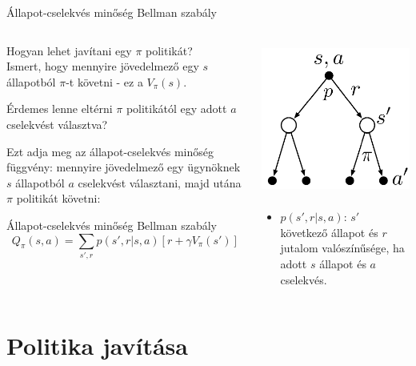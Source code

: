 \documentclass[english, aspectratio=169]{beamer}
\makeatletter
\let\origtableofcontents=\tableofcontents
\def\tableofcontents{\@ifnextchar[{\origtableofcontents}{\gobbletableofcontents}}
\def\gobbletableofcontents#1{\origtableofcontents}
\makeatother
\begin{document}
\begin{frame}{Állapot-cselekvés minőség Bellman szabály}
\begin{columns}
\begin{column}{.6\textwidth}
Hogyan lehet javítani egy $\pi$ politikát?\\
Ismert, hogy mennyire jövedelmező egy $s$ állapotból $\pi$-t követni - ez a $V_\pi(s)$.\par\smallskip 
Érdemes lenne eltérni $\pi$ politikától egy adott $a$ cselekvést választva?\par\smallskip
Ezt adja meg az állapot-cselekvés minőség függvény: mennyire jövedelmező egy ügynöknek $s$ állapotból $a$ cselekvést választani, majd utána $\pi$ politikát követni:\\
\begin{block}{Állapot-cselekvés minőség Bellman szabály}
\[
Q_{\pi}(s,a)=\sum_{s',r}p\left(s',r|s,a\right)\left[r + \gamma V_{\pi}\left(s'\right)\right]
\]
\end{block}
\end{column}
\begin{column}{.45\textwidth}
\begin{center}
\includegraphics[width=5cm, height=5cm, keepaspectratio]{images/reinf_12.png}
\end{center}
\begin{itemize}
	\item $p\left(s',r|s,a\right)$: $s'$ következő állapot és $r$ jutalom valószínűsége, ha adott $s$ állapot és $a$ cselekvés.
\end{itemize}
\end{column}
\end{columns}
\end{frame}

\section{Politika javítása}

\begin{frame}
\tableofcontents[currentsection]
\end{frame}
\end{document}
